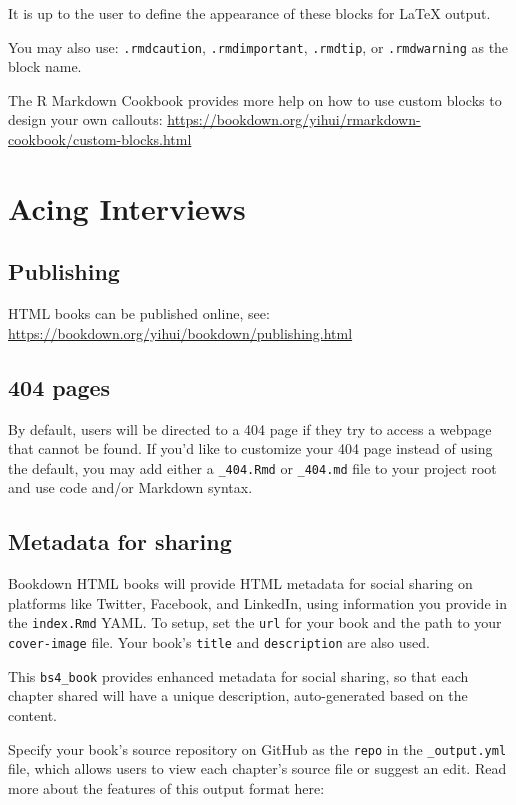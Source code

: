 \documentclass[
]{book}
\theoremstyle{definition}
\theoremstyle{definition}
\theoremstyle{definition}
\theoremstyle{definition}
\theoremstyle{remark}
\begin{document}
It is up to the user to define the appearance of these blocks for LaTeX output.

You may also use: \texttt{.rmdcaution}, \texttt{.rmdimportant}, \texttt{.rmdtip}, or \texttt{.rmdwarning} as the block name.

The R Markdown Cookbook provides more help on how to use custom blocks to design your own callouts: \url{https://bookdown.org/yihui/rmarkdown-cookbook/custom-blocks.html}

\chapter{Acing Interviews}\label{acing-interviews}

\section{Publishing}\label{publishing}

HTML books can be published online, see: \url{https://bookdown.org/yihui/bookdown/publishing.html}

\section{404 pages}\label{pages}

By default, users will be directed to a 404 page if they try to access a webpage that cannot be found. If you'd like to customize your 404 page instead of using the default, you may add either a \texttt{\_404.Rmd} or \texttt{\_404.md} file to your project root and use code and/or Markdown syntax.

\section{Metadata for sharing}\label{metadata-for-sharing}

Bookdown HTML books will provide HTML metadata for social sharing on platforms like Twitter, Facebook, and LinkedIn, using information you provide in the \texttt{index.Rmd} YAML. To setup, set the \texttt{url} for your book and the path to your \texttt{cover-image} file. Your book's \texttt{title} and \texttt{description} are also used.

This \texttt{bs4\_book} provides enhanced metadata for social sharing, so that each chapter shared will have a unique description, auto-generated based on the content.

Specify your book's source repository on GitHub as the \texttt{repo} in the \texttt{\_output.yml} file, which allows users to view each chapter's source file or suggest an edit. Read more about the features of this output format here:
\end{document}
